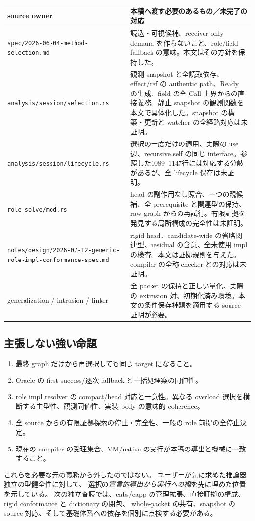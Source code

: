 \documentclass[11pt,a4paper]{article}
\begin{document}
\begin{longtable}{p{}p{}}
\toprule source owner & 本稿へ渡す必要のあるもの／未完了の対応 \\
\midrule\endhead
\nolinkurl{spec/2026-06-04-method-selection.md} & 読込・可視候補、receiver-only demand を作らないこと、role/field fallback の意味。本文はその方針を保持した。\\
\nolinkurl{analysis/session/selection.rs} & 観測 snapshot と全読取依存、effect/ref の authentic path、Ready の生成、field の全 Call 上界からの直接義務。静止 snapshot の観測関数を本文で具体化した。snapshot の構築・更新と watcher の全経路対応は未証明。\\
\nolinkurl{analysis/session/lifecycle.rs} & 選択の一度だけの適用、実際の use 辺、recursive self の同じ interface。参照した1089--1147行には対応する分岐があるが、全 lifecycle 保存は未証明。\\
\nolinkurl{role_solve/mod.rs} & head の副作用なし照合、一つの親候補、全 prerequisite と関連型の保持、raw graph からの再試行。有限証拠を発見する局所構成の完全性は未証明。\\
\nolinkurl{notes/design/2026-07-12-generic-role-impl-conformance-spec.md} & rigid head、candidate-wide の省略関連型、residual の含意、全未使用 impl の検査。本文は証拠規則を与えた。compiler の全称 checker との対応は未証明。\\
generalization / intrusion / linker & 全 packet の保持と正しい量化、実際の extrusion 対、初期化済み環境。本文の条件保存補題を適用する source 証明が必要。\\
\bottomrule
\end{longtable}

\subsection{主張しない強い命題}

\begin{enumerate}
\item 最終 graph だけから再選択しても同じ target になること。
\item Oracle の first-success/逐次 fallback と一括処理案の同値性。
\item role impl resolver の compact/head 対応と一意性。異なる overload 選択を横断する主型性、観測同値性、実装 body の意味的 coherence。
\item 全 source からの有限証拠探索の停止・完全性、一般の role 前提の全停止決定。
\item 現在の compiler の受理集合、VM/native の実行が本稿の導出と機械に一致すること。
\end{enumerate}
これらを必要な元の義務から外したのではない。
ユーザーが先に求めた推論器独立の型健全性に対して、
選択の\emph{宣言的導出から実行への橋}を先に埋めた位置を示している。
次の独立査読では、eabs/eapp の管理拡張、直接証拠の構成、rigid conformance と dictionary の閉包、
whole-packet の共有、snapshot の source 対応、そして基礎体系への依存を個別に点検する必要がある。
\end{document}
